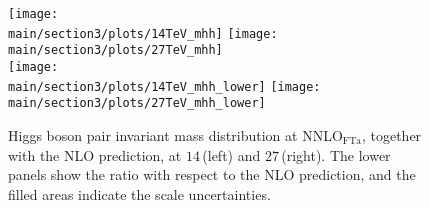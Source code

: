 \begin{figure}[t!]
\begin{center}
\texttt{[image: \\main/section3/plots/14TeV\_mhh]}
\hfill
\texttt{[image: \\main/section3/plots/27TeV\_mhh]}
\\
\texttt{[image: \\main/section3/plots/14TeV\_mhh\_lower]}
\hfill
\texttt{[image: \\main/section3/plots/27TeV\_mhh\_lower]}
\end{center}
\vspace{-2ex}
\caption{\label{fig:mhh_NNLO}
Higgs boson pair invariant mass distribution at NNLO$_{\mathrm{FTa}}$, together with the NLO prediction, at $14\,$\UTeV (left) and $27\,$\UTeV (right). The lower panels show the ratio with respect to the NLO prediction, and the filled areas indicate the scale uncertainties.
}
\end{figure}
